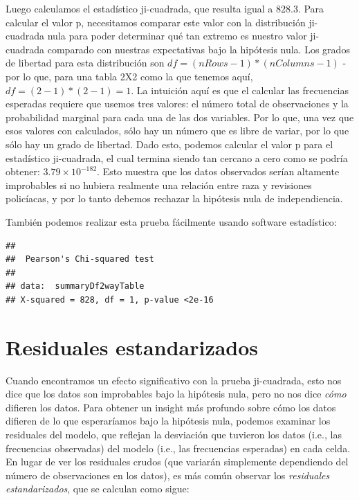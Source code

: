 \documentclass[
  12pt,
]{book}
\begin{document}
Luego calculamos el estadístico ji-cuadrada, que resulta igual a 828.3.
Para calcular el valor p, necesitamos comparar este valor con la distribución ji-cuadrada nula para poder determinar qué tan extremo es nuestro valor ji-cuadrada comparado con nuestras expectativas bajo la hipótesis nula. Los grados de libertad para esta distribución son \(df = (nRows - 1) * (nColumns - 1)\) - por lo que, para una tabla 2X2 como la que tenemos aquí, \(df = (2-1)*(2-1)=1\). La intuición aquí es que el calcular las frecuencias esperadas requiere que usemos tres valores: el número total de observaciones y la probabilidad marginal para cada una de las dos variables. Por lo que, una vez que esos valores con calculados, sólo hay un número que es libre de variar, por lo que sólo hay un grado de libertad. Dado esto, podemos calcular el valor p para el estadístico ji-cuadrada, el cual termina siendo tan cercano a cero como se podría obtener: \(3.79 \times 10^{-182}\). Esto muestra que los datos observados serían altamente improbables si no hubiera realmente una relación entre raza y revisiones policíacas, y por lo tanto debemos rechazar la hipótesis nula de independiencia.

También podemos realizar esta prueba fácilmente usando software estadístico:

\begin{verbatim}
## 
##  Pearson's Chi-squared test
## 
## data:  summaryDf2wayTable
## X-squared = 828, df = 1, p-value <2e-16
\end{verbatim}

\hypertarget{residuales-estandarizados}{%
\section{Residuales estandarizados}\label{residuales-estandarizados}}

Cuando encontramos un efecto significativo con la prueba ji-cuadrada, esto nos dice que los datos son improbables bajo la hipótesis nula, pero no nos dice \emph{cómo} difieren los datos. Para obtener un insight más profundo sobre cómo los datos difieren de lo que esperaríamos bajo la hipótesis nula, podemos examinar los residuales del modelo, que reflejan la desviación que tuvieron los datos (i.e., las frecuencias observadas) del modelo (i.e., las frecuencias esperadas) en cada celda. En lugar de ver los residuales crudos (que variarán simplemente dependiendo del número de observaciones en los datos), es más común observar los \emph{residuales estandarizados}, que se calculan como sigue:
\end{document}
